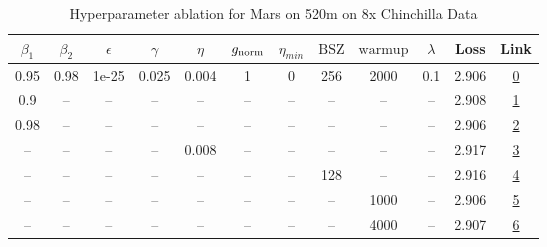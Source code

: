 \begin{table}[H]
\centering
\caption{Hyperparameter ablation for Mars on 520m on 8x Chinchilla Data}
\label{tab:ablation_mars_520m_on_8x_chinchilla_data}
\begin{tabular}{cccccccccccc}
\toprule
$\beta_1$ & $\beta_2$ & $\epsilon$ & $\gamma$ & $\eta$ & $g_{\mathrm{norm}}$ & $\eta_{min}$ & $\mathrm{BSZ}$ & $\mathrm{warmup}$ & $\lambda$ & Loss & Link \\
\midrule
0.95 & 0.98 & 1e-25 & 0.025 & 0.004 & 1 & 0 & 256 & 2000 & 0.1 & 2.906 & \href{https://wandb.ai/marin-community/optimizer-scaling/runs/sweep-520m-85B-mars995e4flr0.004-wd0.1-minlr0-warmup2000-b10.95--18e62c}{0} \\
\midrule
0.9 & -- & -- & -- & -- & -- & -- & -- & -- & -- & 2.908 & \href{https://wandb.ai/marin-community/optimizer-scaling/runs/sweep-520m-85B-mars277fd9lr0.004-wd0.1-minlr0-warmup2000-b10.9-b-4a0179}{1} \\
0.98 & -- & -- & -- & -- & -- & -- & -- & -- & -- & 2.906 & \href{https://wandb.ai/marin-community/optimizer-scaling/runs/sweep-520m-85B-marsb6a610lr0.004-wd0.1-minlr0-warmup2000-b10.98--b56c02}{2} \\
-- & -- & -- & -- & 0.008 & -- & -- & -- & -- & -- & 2.917 & \href{https://wandb.ai/marin-community/optimizer-scaling/runs/sweep-520m-85B-marsf698a0lr0.008-wd0.1-minlr0-warmup2000-b10.95--ce7d2d}{3} \\
-- & -- & -- & -- & -- & -- & -- & 128 & -- & -- & 2.916 & \href{https://wandb.ai/marin-community/optimizer-scaling/runs/sweep-520m-85B-marse53488lr0.004-wd0.1-minlr0-warmup2000-b10.95--77623f}{4} \\
-- & -- & -- & -- & -- & -- & -- & -- & 1000 & -- & 2.906 & \href{https://wandb.ai/marin-community/optimizer-scaling/runs/sweep-520m-85B-mars1c70a7lr0.004-wd0.1-minlr0-warmup1000-b10.95--ef2ded}{5} \\
-- & -- & -- & -- & -- & -- & -- & -- & 4000 & -- & 2.907 & \href{https://wandb.ai/marin-community/optimizer-scaling/runs/sweep-520m-85B-mars8bc425lr0.004-wd0.1-minlr0-warmup4000-b10.95--65ac2e}{6} \\
\bottomrule
\end{tabular}
\end{table}

